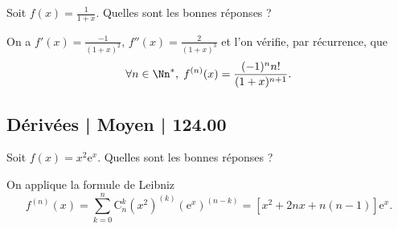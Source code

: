 \begin{question}

Soit $\displaystyle f(x)=\frac{1}{1+x}$. Quelles sont les bonnes réponses ?
\begin{answers}  
\end{answers}
\begin{explanations}
On a $\displaystyle f'(x)=\frac{-1}{(1+x)^2}$, $\displaystyle f''(x)=\frac{2}{(1+x)^3}$ et l'on vérifie, par récurrence, que
$$\forall n\in \Nn^*,\; f^{(n)}(x)=\frac{(-1)^nn!}{(1+x)^{n+1}}.$$
\end{explanations}
\end{question}



\subsection{Dérivées | Moyen | 124.00}




\begin{question}

Soit $\displaystyle f(x)=x^2\mathrm{e}^x$. Quelles sont les bonnes réponses ?
\begin{answers}  
\end{answers}
\begin{explanations}
On applique la formule de Leibniz 
$$\displaystyle f^{(n)}(x)=\sum _{k=0}^n\mathrm{C}_n^k(x^2)^{(k)}(\mathrm{e}^x)^{(n-k)}=[x^2+2nx+n(n-1)]\mathrm{e}^x.$$
\end{explanations}
\end{question}



